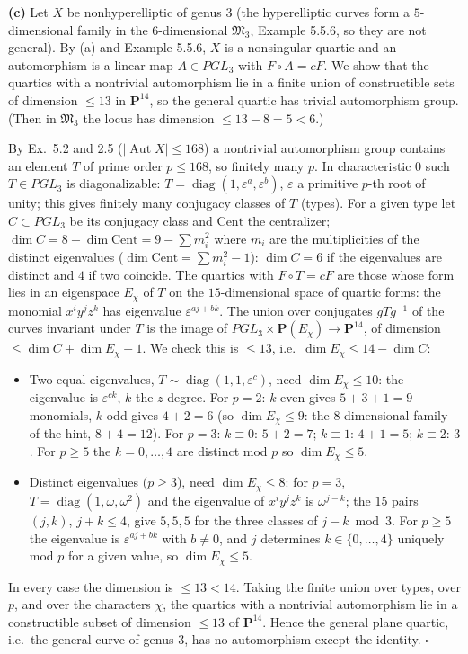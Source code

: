 \documentclass[11pt]{article}
\begin{document}
\textbf{(c)} Let $X$ be nonhyperelliptic of genus $3$ (the hyperelliptic curves form a $5$-dimensional family in the $6$-dimensional $\mathfrak M_3$, Example 5.5.6, so they are not general). By (a) and Example 5.5.6, $X$ is a nonsingular quartic and an automorphism is a linear map $A\in PGL_3$ with $F\circ A=cF$. We show that the quartics with a nontrivial automorphism lie in a finite union of constructible sets of dimension $\le13$ in $\mathbf P^{14}$, so the general quartic has trivial automorphism group. (Then in $\mathfrak M_3$ the locus has dimension $\le13-8=5<6$.)

By Ex.~5.2 and 2.5 ($|\operatorname{Aut}X|\le168$) a nontrivial automorphism group contains an element $T$ of prime order $p\le168$, so finitely many $p$. In characteristic $0$ such $T\in PGL_3$ is diagonalizable: $T=\operatorname{diag}(1,\varepsilon^a,\varepsilon^b)$, $\varepsilon$ a primitive $p$-th root of unity; this gives finitely many conjugacy classes of $T$ (types). For a given type let $C\subset PGL_3$ be its conjugacy class and $\mathrm{Cent}$ the centralizer; $\dim C=8-\dim\mathrm{Cent}=9-\sum m_i^2$ where $m_i$ are the multiplicities of the distinct eigenvalues ($\dim\mathrm{Cent}=\sum m_i^2-1$): $\dim C=6$ if the eigenvalues are distinct and $4$ if two coincide. The quartics with $F\circ T=cF$ are those whose form lies in an eigenspace $E_\chi$ of $T$ on the $15$-dimensional space of quartic forms: the monomial $x^iy^jz^k$ has eigenvalue $\varepsilon^{aj+bk}$. The union over conjugates $gTg^{-1}$ of the curves invariant under $T$ is the image of $PGL_3\times\mathbf P(E_\chi)\to\mathbf P^{14}$, of dimension $\le\dim C+\dim E_\chi-1$. We check this is $\le13$, i.e.\ $\dim E_\chi\le14-\dim C$:

\begin{itemize}
\item Two equal eigenvalues, $T\sim\operatorname{diag}(1,1,\varepsilon^c)$, need $\dim E_\chi\le10$: the eigenvalue is $\varepsilon^{ck}$, $k$ the $z$-degree. For $p=2$: $k$ even gives $5+3+1=9$ monomials, $k$ odd gives $4+2=6$ (so $\dim E_\chi\le9$: the $8$-dimensional family of the hint, $8+4=12$). For $p=3$: $k\equiv0$: $5+2=7$; $k\equiv1$: $4+1=5$; $k\equiv2$: $3$. For $p\ge5$ the $k=0,\dots,4$ are distinct mod $p$ so $\dim E_\chi\le5$.
\item Distinct eigenvalues ($p\ge3$), need $\dim E_\chi\le8$: for $p=3$, $T=\operatorname{diag}(1,\omega,\omega^2)$ and the eigenvalue of $x^iy^jz^k$ is $\omega^{j-k}$; the $15$ pairs $(j,k)$, $j+k\le4$, give $5,5,5$ for the three classes of $j-k\bmod3$. For $p\ge5$ the eigenvalue is $\varepsilon^{aj+bk}$ with $b\ne0$, and $j$ determines $k\in\{0,\dots,4\}$ uniquely mod $p$ for a given value, so $\dim E_\chi\le5$.
\end{itemize}
In every case the dimension is $\le13<14$. Taking the finite union over types, over $p$, and over the characters $\chi$, the quartics with a nontrivial automorphism lie in a constructible subset of dimension $\le13$ of $\mathbf P^{14}$. Hence the general plane quartic, i.e.\ the general curve of genus $3$, has no automorphism except the identity. \hfill$\square$
\end{document}
